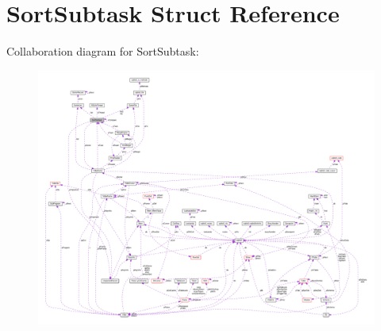 \hypertarget{structSortSubtask}{}\section{Sort\+Subtask Struct Reference}
\label{structSortSubtask}


Collaboration diagram for Sort\+Subtask\+:\nopagebreak
\begin{figure}[H]
\begin{center}
\leavevmode
\includegraphics[width=350pt]{structSortSubtask__coll__graph}
\end{center}
\end{figure}
